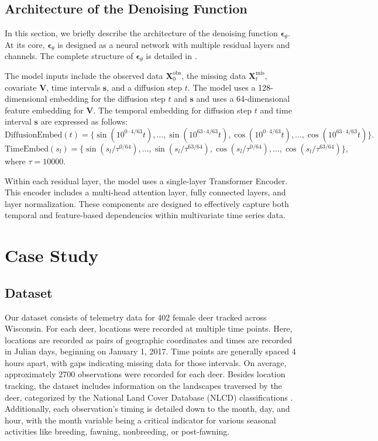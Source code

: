 \documentclass[11pt]{article}
\begin{document}
\subsection{Architecture of the Denoising Function}
In this section, we briefly describe the architecture of the denoising function $\bm{\epsilon}_{\theta}$. At its core, $\bm{\epsilon}_{\theta}$ is designed as a neural network with multiple residual layers and channels. The complete structure of $\bm{\epsilon}_{\theta}$ is detailed in \citet{tashiro2021csdi}.

The model inputs include the observed data $\bm{X}_0^{\mathrm{obs}}$, the missing data $\bm{X}_t^{\mathrm{mis}}$, covariate $\bm{V}$, time intervals $\bm{s}$, and a diffusion step $t$. The model uses a 128-dimensional embedding for 
the diffusion step $t$ and $\bm{s}$ \citep{vaswani2017attention} and uses a 64-dimensional feature embedding for $\bm{V}$. The temporal embedding for diffusion step $t$ and time interval $\bm{s}$ are expressed as follows:
\begin{equation}
	\mathrm{DiffusionEmbed}(t)=\{\sin(10^{0\cdot 4/63}t),\ldots, \sin(10^{63\cdot 4/63}t), \cos(10^{0\cdot 4/63}t),\ldots,\cos(10^{63\cdot 4/63}t)\}.
\end{equation}
\begin{equation}
	\mathrm{TimeEmbed}(s_l)=\{\sin(s_l/\tau^{0/64}),\ldots, \sin(s_l/\tau^{63/64}), \cos(s_l/\tau^{0/64}),\ldots,\cos(s_l/\tau^{63/64})\},
\end{equation}
where $\tau=10000$. 


Within each residual layer, the model uses a single-layer Transformer Encoder. This encoder includes a multi-head attention layer, fully connected layers, and layer normalization. These components are designed to effectively capture both temporal and feature-based dependencies within multivariate time series data. 







\section{Case Study}
\subsection{Dataset}
Our dataset consists of telemetry data for 402 female deer tracked across Wisconsin. For each deer, locations were recorded at multiple time points. Here, locations are recorded as pairs of geographic coordinates and times are recorded in Julian days, beginning on January 1, 2017. Time points are generally spaced 4 hours apart, with gaps indicating missing data for those intervals. On average, approximately 2700 observations were recorded for each deer. Besides location tracking, the dataset includes information on the landscapes traversed by the deer, categorized by the National Land Cover Database (NLCD) classifications \citep{usgs_nlcd_2011}. Additionally, each observation's timing is detailed down to the month, day, and hour, with the month variable being a critical indicator for various seasonal activities like breeding, fawning, nonbreeding, or post-fawning.
\end{document}
